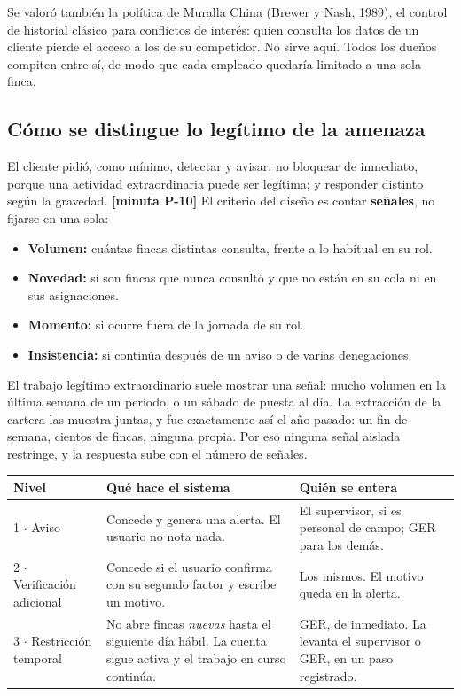 \documentclass[11pt,letterpaper]{article}
\newcommand{\cab}[1]{\textbf{\rmfamily #1}}
\newcommand{\resp}[1]{\textrm{\footnotesize\bfseries [minuta #1]}}
\begin{document}
Se valoró también la política de Muralla China (Brewer y Nash, 1989), el control de historial clásico
para conflictos de interés: quien consulta los datos de un cliente pierde el acceso a los de su
competidor. No sirve aquí. Todos los dueños compiten entre sí, de modo que cada empleado quedaría
limitado a una sola finca.

\subsection{Cómo se distingue lo legítimo de la amenaza}
\label{sec:graduada}

El cliente pidió, como mínimo, detectar y avisar; no bloquear de inmediato, porque una actividad
extraordinaria puede ser legítima; y responder distinto según la gravedad. \resp{P-10} El criterio
del diseño es contar \textbf{señales}, no fijarse en una sola:

\begin{itemize}
\item \textbf{Volumen:} cuántas fincas distintas consulta, frente a lo habitual en su rol.
\item \textbf{Novedad:} si son fincas que nunca consultó y que no están en su cola ni en sus asignaciones.
\item \textbf{Momento:} si ocurre fuera de la jornada de su rol.
\item \textbf{Insistencia:} si continúa después de un aviso o de varias denegaciones.
\end{itemize}

El trabajo legítimo extraordinario suele mostrar una señal: mucho volumen en la última semana de un
período, o un sábado de puesta al día. La extracción de la cartera las muestra juntas, y fue
exactamente así el año pasado: un fin de semana, cientos de fincas, ninguna propia. Por eso ninguna
señal aislada restringe, y la respuesta sube con el número de señales.

\begin{center}
\small
\renewcommand{\arraystretch}{1.22}
\begin{tabularx}{\textwidth}{@{}L{3.3cm} L{5.2cm} Y@{}}
\toprule
\cab{Nivel} & \cab{Qué hace el sistema} & \cab{Quién se entera} \\
 $\cdot$ Aviso & Concede y genera una alerta. El usuario no nota nada. & El supervisor, si es personal de campo; GER para los demás. \\
2 $\cdot$ Verificación adicional & Concede si el usuario confirma con su segundo factor y escribe un motivo. & Los mismos. El motivo queda en la alerta. \\
3 $\cdot$ Restricción temporal & No abre fincas \emph{nuevas} hasta el siguiente día hábil. La cuenta sigue activa y el trabajo en curso continúa. & GER, de inmediato. La levanta el supervisor o GER, en un paso registrado. \\
\bottomrule
\end{tabularx}
\end{center}
\end{document}
